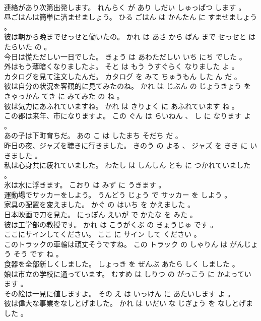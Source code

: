 \documentclass[8pt]{extreport}
\begin{document}
\begin{CJK}{UTF8}{min}
\\	連絡があり次第出発します。	れんらく が あり しだい しゅっぱつ します 。 
\\	昼ごはんは簡単に済ませましょう。	ひる ごはん は かんたん に すませましょう 。 
\\	彼は朝から晩までせっせと働いたの。	かれ は あさ から ばん まで せっせと はたらいた の 。 
\\	今日は慌ただしい一日でした。	きょう は あわただしい いち にち でした 。 
\\	外はもう薄暗くなりましたよ。	そと は もう うすぐらく なりました よ 。 
\\	カタログを見て注文したんだ。	カタログ を みて ちゅうもん した ん だ 。 
\\	彼は自分の状況を客観的に見てみたのね。	かれ は じぶん の じょうきょう を きゃっかん てき に みてみた の ね 。 
\\	彼は気力にあふれていますね。	かれ は きりょく に あふれています ね 。 
\\	この郡は来年、市になりますよ。	この ぐん は らいねん 、 し に なります よ 。 
\\	あの子は下町育ちだ。	あの こ は したまち そだち だ 。 
\\	昨日の夜、ジャズを聴きに行きました。	きのう の よる 、 ジャズ を きき に いきました 。 
\\	私は心身共に疲れていました。	わたし は しんしん とも に つかれていました 。 
\\	氷は水に浮きます。	こおり は みず に うきます 。 
\\	運動場でサッカーをしよう。	うんどう じょう で サッカー を しよう 。 
\\	家具の配置を変えました。	かぐ の はいち を かえました 。 
\\	日本映画で刀を見た。	にっぽん えいが で かたな を みた 。 
\\	彼は工学部の教授です。	かれ は こうがくぶ の きょうじゅ です 。 
\\	ここにサインしてください。	ここ に サイン して ください 。 
\\	このトラックの車輪は頑丈そうですね。	この トラック の しゃりん は がんじょう そう です ね 。 
\\	食器を全部新しくしました。	しょっき を ぜんぶ あたら しく しました 。 
\\	娘は市立の学校に通っています。	むすめ は しりつ の がっこう に かよっています 。 
\\	その絵は一見に値しますよ。	その え は いっけん に あたいします よ 。 
\\	彼は偉大な事業をなしとげました。	かれ は いだい な じぎょう を なしとげました 。 

\end{CJK}
\end{document}
